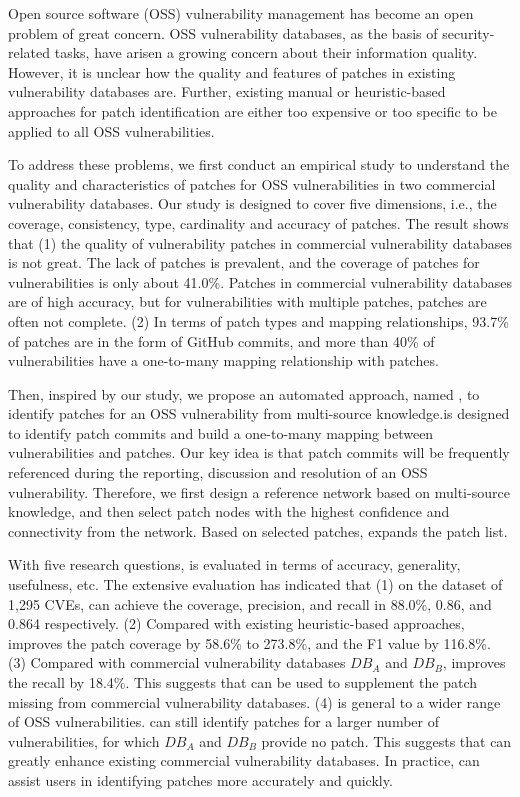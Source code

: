 \begin{abstract*}
Open source software (OSS) vulnerability management has become an open problem of great concern.%
OSS vulnerability databases, as the basis of security-related tasks, have arisen a growing concern about their information quality. However, it is unclear how the quality and features of patches in existing vulnerability databases are. Further, existing manual or heuristic-based approaches for patch identification are either too expensive or too specific to be applied to all OSS vulnerabilities.

To address these problems, we first conduct an empirical study to understand the quality and characteristics of patches for OSS vulnerabilities in two commercial vulnerability databases. Our study is designed to cover five dimensions, i.e., the coverage, consistency, type, cardinality and accuracy of patches. The result shows that (1) the quality of vulnerability patches in commercial vulnerability databases is not great. The lack of patches is prevalent, and the coverage of patches for vulnerabilities is only about 41.0\%. Patches in commercial vulnerability databases are of high accuracy, but for vulnerabilities with multiple patches, patches are often not complete. (2) In terms of patch types and mapping relationships, 93.7\% of patches are in the form of GitHub commits, and more than 40\% of vulnerabilities have a one-to-many mapping relationship with patches.

Then, inspired by our study, we propose an automated approach, named \tool, to identify patches for an OSS vulnerability from multi-source knowledge.\tool is designed to identify patch commits and build a one-to-many mapping between vulnerabilities and patches. Our key idea is that patch commits will be frequently referenced during the reporting, discussion and resolution of an OSS vulnerability. Therefore, we first design a reference network based on multi-source knowledge, and then select patch nodes with the highest confidence and connectivity from the network. Based on selected patches, \tool expands the patch list.

With five research questions, \tool is evaluated in terms of accuracy, generality, usefulness, etc. The extensive evaluation has indicated that (1) on the dataset of 1,295 CVEs, \tool can achieve the coverage, precision, and recall in 88.0\%, 0.86, and 0.864 respectively. (2) Compared with existing heuristic-based approaches, \tool improves the patch coverage by 58.6\% to 273.8\%, and the F1 value by 116.8\%. (3) Compared with commercial vulnerability databases $DB_A$ and $DB_B$, \tool improves the recall by 18.4\%. This suggests that \tool can be used to supplement the patch missing from commercial vulnerability databases. (4) \tool is general to a wider range of OSS vulnerabilities. \tool can still identify patches for a larger number of vulnerabilities, for which $DB_A$ and $DB_B$ provide no patch. This suggests that \tool can greatly enhance existing commercial vulnerability databases. In practice, \tool can assist users in identifying patches more accurately and quickly.
\end{abstract*}